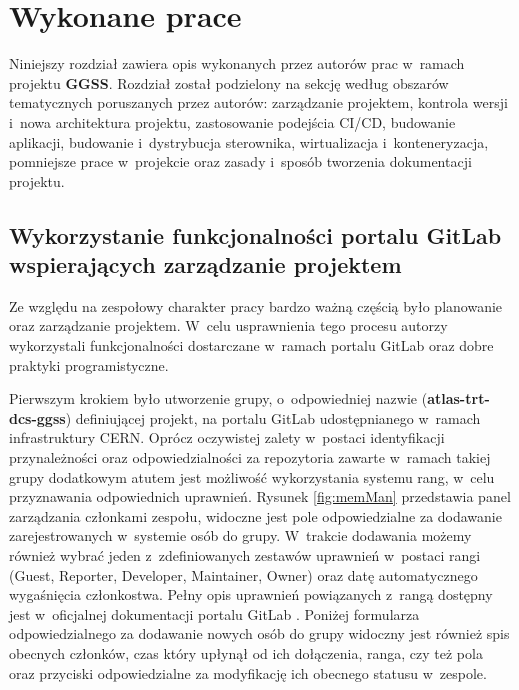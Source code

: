 
\chapter{Wykonane prace}
\label{cha:prace}

Niniejszy rozdział zawiera opis wykonanych przez autorów prac w~ramach projektu \textbf{GGSS}. Rozdział został podzielony na sekcję według obszarów tematycznych poruszanych przez autorów: zarządzanie projektem, kontrola wersji i~nowa architektura projektu, zastosowanie podejścia CI/CD, budowanie aplikacji, budowanie i~dystrybucja sterownika, wirtualizacja i~konteneryzacja, pomniejsze prace w~projekcie oraz zasady i~sposób tworzenia dokumentacji projektu.

\section{Wykorzystanie funkcjonalności portalu GitLab wspierających zarządzanie projektem}

Ze względu na zespołowy charakter pracy bardzo ważną częścią było planowanie oraz zarządzanie projektem. W~celu usprawnienia tego procesu autorzy wykorzystali funkcjonalności dostarczane w~ramach portalu GitLab oraz dobre praktyki programistyczne.

Pierwszym krokiem było utworzenie grupy, o~odpowiedniej nazwie (\textbf{atlas-trt-dcs-ggss}) definiującej projekt, na portalu GitLab udostępnianego w~ramach infrastruktury CERN. Oprócz oczywistej zalety w~postaci identyfikacji przynależności oraz odpowiedzialności za repozytoria zawarte w~ramach takiej grupy dodatkowym atutem jest możliwość wykorzystania systemu rang, w~celu przyznawania odpowiednich uprawnień. Rysunek \ref{fig:memMan} przedstawia panel zarządzania członkami zespołu, widoczne jest pole odpowiedzialne za dodawanie zarejestrowanych w~systemie osób do grupy. W~trakcie dodawania możemy również wybrać jeden z~zdefiniowanych zestawów uprawnień w~postaci rangi (Guest, Reporter, Developer, Maintainer, Owner) oraz datę automatycznego wygaśnięcia członkostwa. Pełny opis uprawnień powiązanych z~rangą dostępny jest w~oficjalnej dokumentacji portalu GitLab \cite{GitLabPermissions}. Poniżej formularza odpowiedzialnego za dodawanie nowych osób do grupy widoczny jest również spis obecnych członków, czas który upłynął od ich dołączenia, ranga, czy też pola oraz przyciski odpowiedzialne za modyfikację ich obecnego statusu w~zespole.

